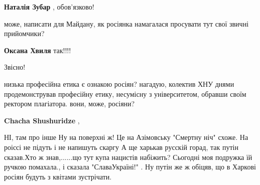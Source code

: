 \begin{itemize}
\begin{itemize}
\textbf{Наталія Зубар} , обов'язково!

 
може, написати для Майдану, як росіянка намагалася просувати тут свої звичні прийомчики?

 
\textbf{Оксана Хвиля} так!!!!

 
Звісно!

 
низька професійна етика є ознакою росіян? нагадую, колектив ХНУ днями продемонстрував професійну етику, несумісну з університетом, обравши своїм ректором плагіатора. вони, може, росіяни?

 
\textbf{Chacha Shushuridze} , 

НІ, там про інше Ну на поверхні ж! Це на Азімовську "Смертну ніч" схоже. На
роіссі не підуть і не напишуть скаргу А ще харькав русскій горад, так путін
сказав.Хто ж знав,......що тут купа нацистів набіжить? Сьогодні моя подружка їй
ручкою помахала., і сказала "СлаваУкраїні!" . Ну путін же ж обіцяв, що в
Харкові росіян будуть з квітами зустрічати.



 

\end{itemize}
\end{itemize}
